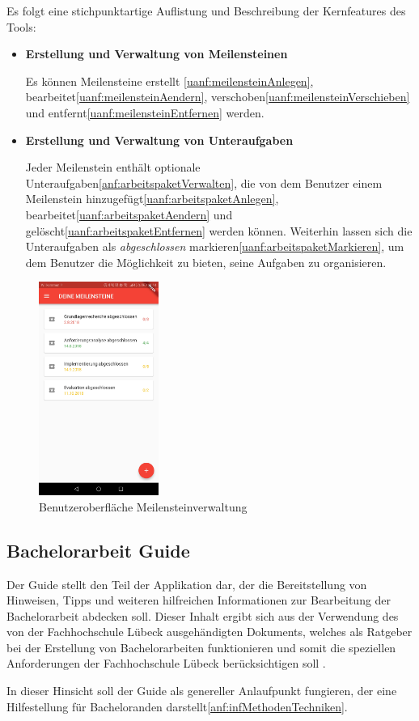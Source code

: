 \documentclass[bibliography=totoc,listof=totoc,BCOR=5mm,DIV=12,oneside]{scrbook}
\begin{document}
\par\bigskip Es folgt eine stichpunktartige Auflistung und Beschreibung der Kernfeatures des Tools:
\begin{itemize}
\item \textbf{Erstellung und Verwaltung von Meilensteinen}
\par Es können Meilensteine erstellt \ref{uanf:meilensteinAnlegen}, bearbeitet\ref{uanf:meilensteinAendern}, verschoben\ref{uanf:meilensteinVerschieben} und entfernt\ref{uanf:meilensteinEntfernen} werden. 
\item \textbf{Erstellung und Verwaltung von Unteraufgaben}
\par Jeder Meilenstein enthält optionale Unteraufgaben\ref{anf:arbeitspaketVerwalten}, die von dem Benutzer einem Meilenstein hinzugefügt\ref{uanf:arbeitspaketAnlegen}, bearbeitet\ref{uanf:arbeitspaketAendern} und gelöscht\ref{uanf:arbeitspaketEntfernen} werden können. Weiterhin lassen sich die Unteraufgaben als \textit{abgeschlossen} markieren\ref{uanf:arbeitspaketMarkieren}, um dem Benutzer die Möglichkeit zu bieten, seine Aufgaben zu organisieren.
\end{itemize}

\bigskip
\begin{figure}[H]
	\centering
	\includegraphics[width=0.35\textwidth, keepaspectratio]{Bilder/Prototyp/app_screenshots/MeilensteinOverviewScreenshot.jpg}
	\caption{Benutzeroberfläche Meilensteinverwaltung}
	\label{img:fortschrittsmanagement}
\end{figure}

\newpage
\subsection{Bachelorarbeit Guide}
\par Der Guide stellt den Teil der Applikation dar, der die Bereitstellung von Hinweisen, Tipps und weiteren hilfreichen Informationen zur Bearbeitung der Bachelorarbeit abdecken soll. Dieser Inhalt ergibt sich aus der Verwendung des von der Fachhochschule Lübeck ausgehändigten Dokuments, welches als Ratgeber bei der Erstellung von Bachelorarbeiten funktionieren und somit die speziellen Anforderungen der Fachhochschule Lübeck berücksichtigen soll \citep{FHLuebeckBAAnleitung}.
\par \bigskip In dieser Hinsicht soll der Guide als genereller Anlaufpunkt fungieren, der eine Hilfestellung für Bacheloranden darstellt\ref{anf:infMethodenTechniken}.
\end{document}
